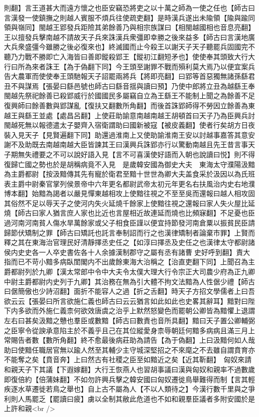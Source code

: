 則翻】言王道甚大而遠方懷之也臣安竊恐將吏之以十萬之師為一使之任也【師古曰言漢發一使鎮撫之則越人賓服不煩兵往使疏吏翻】是時漢兵遂出未隃領【隃與踰同領與嶺同】閩越王郢發兵距險其弟餘善乃與相宗族謀曰【相閩越國相也音息亮翻】王以擅發兵擊南越不請故天子兵來誅漢兵衆彊即幸勝之後來益多【師古曰言漢地廣大兵衆盛彊今雖勝之後必復來也】終滅國而止今殺王以謝天子天子聽罷兵固國完不聽乃力戰不勝即亡入海皆曰善即鏦殺郢王【鏦初江翻短矛也】使使奉其頭致大行大行曰所為來者誅王【為于偽翻下同】今王頭至謝罪不戰而殞利莫大焉乃以便宜案兵告大農軍而使使奉王頭馳報天子詔罷兩將兵【將即亮翻】曰郢等首惡獨無諸孫繇君丑不與謀焉【張晏曰繇邑號也師古曰繇音揺與讀曰預】乃使中郎將立丑為越繇王奉閩越先祭祀餘善已殺郢威行於國國民多屬竊自立為王繇王不能制上聞之為餘善不足復興師曰餘善數與郢謀亂【復扶又翻數所角翻】而後首誅郢師得不勞因立餘善為東越王與繇王並處【處昌呂翻】上使莊助諭意南越南越王胡頓首曰天子乃為臣興兵討閩越死無以報德遣太子嬰齊入宿衛謂助曰國新被寇【被皮義翻】使者行矣胡方日夜裝入見天子【見賢遍翻下同】助還過淮南上又使助諭淮南王安以討越事嘉答其意安謝不及助既去南越南越大臣皆諫其王曰漢興兵誅郢亦行以驚動南越且先王昔言事天子期無失禮要之不可以說好語入見【言不可喜漢使好語而入朝也說讀曰悦】則不得復歸亡國之勢也於是胡稱病竟不入見　是歲韓安國為御史大夫　東海太守濮陽汲黯為主爵都尉【按汲黯傳其先有寵於衛君至黯十世世為卿大夫盖食采於汲因以為氏班表主爵中尉秦官掌列侯景帝中六年更名都尉武帝太初元年更名右扶風治内史右地濮博本翻】始黯為謁者以嚴見憚東越相攻上使黯往視之不至至吳而還報曰越人相攻固其俗然不足以辱天子之使河内失火延燒千餘家上使黯往視之還報曰家人失火屋比延燒【師古曰家人猶言庶人家也比近也言屋相近故連延而燒也比頻寐翻】不足憂也臣過河南河南貧人傷水旱萬餘家或父子相食臣謹以便宜持節發河南倉粟以振貧民臣請歸節伏矯制之罪【師古曰矯託也託言奉制詔而行之也漢律矯制者論棄市罪】上賢而釋之其在東海治官理民好清靜擇丞史任之【如淳曰擇丞及史任之也漢律太守都尉諸侯内史史各一人卒史書佐各十人余據漢制郡守之屬有丞有諸曹史好呼到翻】責大指而已不苛小黯多病臥閨閣内不出歲餘東海大治稱之【治直吏翻下同】上聞召為主爵都尉列於九卿【漢太常郎中令中大夫令太僕大理大行令宗正大司農少府為正九卿中尉主爵都尉内史列于九卿】其治務在無為引大體不拘文法黯為人性倨少禮【師古曰倨簡傲也少詩沼翻】面折不能容人之過【折之舌翻】時天子方招文學儒者上曰吾欲云云【張晏曰所言欲施仁義也師古曰云云猶言如此如此也史畧其辭耳】黯對曰陛下内多欲而外施仁義柰何欲效唐虞之治乎上默然怒變色而罷朝公卿皆為黯懼上退謂左右曰甚矣汲黯之戇也羣臣或數黯【師古曰數責也音所具翻】黯曰天子置公卿輔弼之臣寧令從諛承意陷主於不義乎且己在其位縱愛身柰辱朝廷何黯多病病且滿三月上常賜告者數【數所角翻】終不愈最後病莊助為請告【為于偽翻】上曰汲黯何如人哉助曰使黯任職居官無以踰人然至其輔少主守城深堅招之不來麾之不去雖自謂賁育亦不能奪之矣【賁音奔】上曰然古有社稷之臣至如黯近之矣【近其靳翻】　匈奴來請和親天子下其議【下遐嫁翻】大行王恢燕人也習胡事議曰漢與匈奴和親率不過數歲即復倍約【倍蒲妹翻】不如勿許興兵擊之韓安國曰匈奴遷徙鳥舉難得而制【言其輕疾逐水草遷徙若鳥之舉也】自上古不屬為人【不以人類待之】今漢行數千里與之爭利則人馬罷乏【罷讀曰疲】虜以全制其敝此危道也不如和親羣臣議者多附安國於是上許和親<br />
